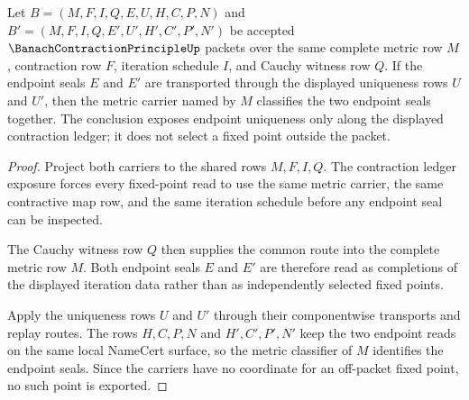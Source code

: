 \begin{theorem}
\label{thm:banach-contraction-principle-endpoint-uniqueness}
Let $B=(M,F,I,Q,E,U,H,C,P,N)$ and $B'=(M,F,I,Q,E',U',H',C',P',N')$ be accepted $\BanachContractionPrincipleUp$ packets over the same complete metric row $M$, contraction row $F$, iteration schedule $I$, and Cauchy witness row $Q$. If the endpoint seals $E$ and $E'$ are transported through the displayed uniqueness rows $U$ and $U'$, then the metric carrier named by $M$ classifies the two endpoint seals together. The conclusion exposes endpoint uniqueness only along the displayed contraction ledger; it does not select a fixed point outside the packet.
\end{theorem}
\begin{proof}
Project both carriers to the shared rows $M,F,I,Q$. The contraction ledger exposure forces every fixed-point read to use the same metric carrier, the same contractive map row, and the same iteration schedule before any endpoint seal can be inspected.

The Cauchy witness row $Q$ then supplies the common route into the complete metric row $M$. Both endpoint seals $E$ and $E'$ are therefore read as completions of the displayed iteration data rather than as independently selected fixed points.

Apply the uniqueness rows $U$ and $U'$ through their componentwise transports and replay routes. The rows $H,C,P,N$ and $H',C',P',N'$ keep the two endpoint reads on the same local NameCert surface, so the metric classifier of $M$ identifies the endpoint seals. Since the carriers have no coordinate for an off-packet fixed point, no such point is exported.
\end{proof}

